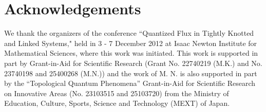\documentclass[aps,prd,preprint,
superscriptaddress]{revtex4}
\newcommand {\1}[1]{\frac{1}{#1}}
\newcommand {\2}[1]{\frac{i}{#1}}
\begin{document}
\section*{Acknowledgements}


We thank the organizers of the conference 
``Quantized Flux in Tightly Knotted and Linked Systems," 
held in 3 - 7 December 2012 at Isaac Newton Institute 
for Mathematical Sciences, where this work was initiated. 
This work is supported in part by 
Grant-in-Aid for Scientific Research (Grant No. 22740219 (M.K.) and No. 23740198 and 25400268 (M.N.)) 
and the work of M. N. is also supported in part by 
the ``Topological Quantum Phenomena'' 
Grant-in-Aid for Scientific Research 
on Innovative Areas (No. 23103515 and 25103720)  
from the Ministry of Education, Culture, Sports, Science and Technology 
(MEXT) of Japan. 
\end{document}
